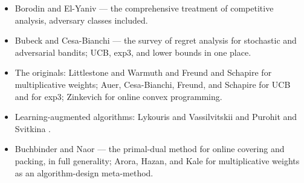 \begin{itemize}
\item Borodin and El-Yaniv \citep{online-decisions-bg5} --- the comprehensive
  treatment of competitive analysis, adversary classes included.
\item Bubeck and Cesa-Bianchi \citep{online-decisions-bg4} --- the survey of
  regret analysis for stochastic and adversarial bandits; UCB, exp3, and
  lower bounds in one place.
\item The originals: Littlestone and Warmuth \citep{online-decisions-bg6} and
  Freund and Schapire \citep{online-decisions-bg7} for multiplicative weights;
  Auer, Cesa-Bianchi, Freund, and Schapire \citep{online-decisions-bg3} for
  UCB and \citep{online-decisions-bg8} for exp3; Zinkevich
  \citep{online-decisions-bg11} for online convex programming.
\item Learning-augmented algorithms: Lykouris and Vassilvitskii
  \citep{online-decisions-bg9} and Purohit and Svitkina
  \citep{online-decisions-bg13}.
\item Buchbinder and Naor \citep{online-decisions-bg10} --- the primal-dual
  method for online covering and packing, in full generality; Arora, Hazan,
  and Kale \citep{online-decisions-bg12} for multiplicative weights as an
  algorithm-design meta-method.
\end{itemize}

